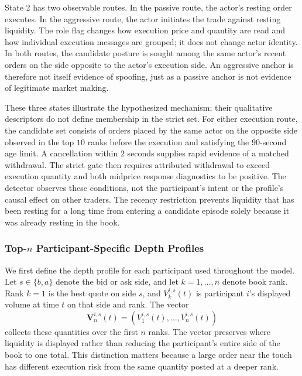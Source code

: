 \documentclass[11pt]{article}
\newenvironment{review}{\begingroup\color{blue}}{\endgroup}
\begin{document}
State 2 has two observable routes. In the passive route, the actor's resting order executes. In the aggressive route, the
actor initiates the trade against resting liquidity. The role flag changes how execution price and quantity are read and how
individual execution messages are grouped; it does not change actor identity. In both routes, the candidate posture is sought among the
same actor's recent orders on the side opposite to the actor's execution side. An aggressive anchor is therefore not itself
evidence of spoofing, just as a passive anchor is not evidence of legitimate market making.

These three states illustrate the hypothesized mechanism; their qualitative descriptors do not define \begin{review}membership in the strict set\end{review}. For either execution route, the candidate set consists of \begin{review}orders placed by the same actor on the opposite side\end{review} observed in the top
$10$ ranks before the execution and satisfying the $90$-second age limit. A cancellation within $2$ seconds supplies \begin{review}rapid evidence of a matched withdrawal\end{review}. The strict gate then requires attributed withdrawal to exceed execution quantity and both
midprice response diagnostics to be positive. The detector observes these conditions, not the participant's intent or the
profile's causal effect on other traders. The recency restriction prevents \begin{review}liquidity that has been resting for a long time\end{review} from entering a candidate
episode solely because it was already resting in the book.

\subsubsection{\texorpdfstring{Top-$n$}{Top-n} Participant-Specific Depth Profiles}
\label{subsec:topn_depth_profiles}

We first define the \begin{review}depth profile for each participant\end{review} used throughout the model. Let $s \in \{b,a\}$ denote the bid or
ask side, and let $k=1,\ldots,n$ denote book rank. Rank $k=1$ is the best quote on side $s$, and
$V^{i,s}_{k}(t)$ is participant $i$'s displayed volume at time $t$ on that side and rank. The vector
\begin{equation}
    \mathbf{V}^{i,s}_{n}(t)
    = \left(V^{i,s}_{1}(t),\ldots,V^{i,s}_{n}(t)\right)
\end{equation}
collects these quantities over the first $n$ ranks. The vector preserves where liquidity is displayed rather than reducing
the participant's entire side of the book to one total. This distinction matters because a large order near the touch has
different execution risk from the same quantity posted at a deeper rank.
\end{document}
